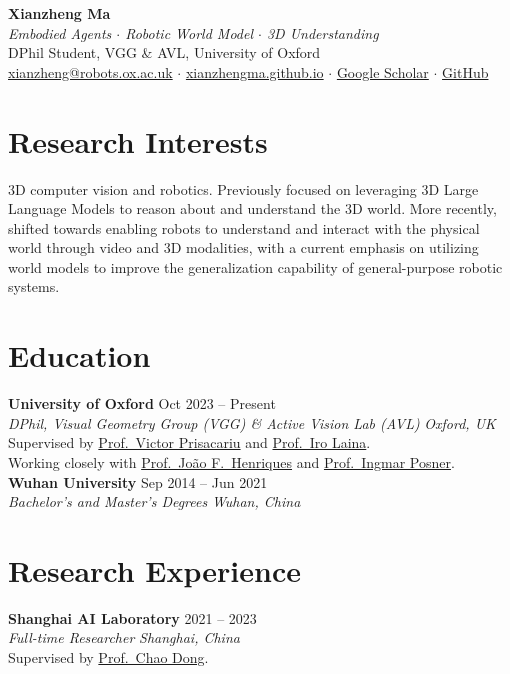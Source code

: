 \documentclass[11pt,a4paper]{article}
\newcommand{\cventry}[4]{%
  \noindent\textbf{#1} \hfill #2 \\
  \textit{#3} \hfill \textit{#4} \\[2pt]
}
\begin{document}
\begin{center}
  {\LARGE \textbf{Xianzheng Ma}} \\[4pt]
  \textit{Embodied Agents $\cdot$ Robotic World Model $\cdot$ 3D Understanding} \\[4pt]
  DPhil Student, VGG \& AVL, University of Oxford \\[3pt]
  \href{mailto:xianzheng@robots.ox.ac.uk}{xianzheng@robots.ox.ac.uk} $\cdot$
  \href{https://xianzhengma.github.io}{xianzhengma.github.io} $\cdot$
  \href{https://scholar.google.com/citations?user=NS8g2mMAAAAJ}{Google Scholar} $\cdot$
  \href{https://github.com/xianzhengma}{GitHub}
\end{center}

\section{Research Interests}
3D computer vision and robotics. Previously focused on leveraging 3D Large Language Models to reason about and understand the 3D world. More recently, shifted towards enabling robots to understand and interact with the physical world through video and 3D modalities, with a current emphasis on utilizing world models to improve the generalization capability of general-purpose robotic systems.

\section{Education}
\cventry{University of Oxford}{Oct 2023 -- Present}{DPhil, Visual Geometry Group (VGG) \& Active Vision Lab (AVL)}{Oxford, UK}
Supervised by \href{https://www.robots.ox.ac.uk/~victor/}{Prof.\ Victor Prisacariu} and \href{https://eng.ox.ac.uk/people/iro-laina/}{Prof.\ Iro Laina}. \\
Working closely with \href{https://www.robots.ox.ac.uk/~joao/}{Prof.\ Jo\~{a}o F.\ Henriques} and \href{https://ori.ox.ac.uk/people/ingmar-posner}{Prof.\ Ingmar Posner}. \\[6pt]

\cventry{Wuhan University}{Sep 2014 -- Jun 2021}{Bachelor's and Master's Degrees}{Wuhan, China}

\section{Research Experience}
\cventry{Shanghai AI Laboratory}{2021 -- 2023}{Full-time Researcher}{Shanghai, China}
Supervised by \href{http://xpixel.group/2010/01/20/chaodong.html}{Prof.\ Chao Dong}.
\end{document}
